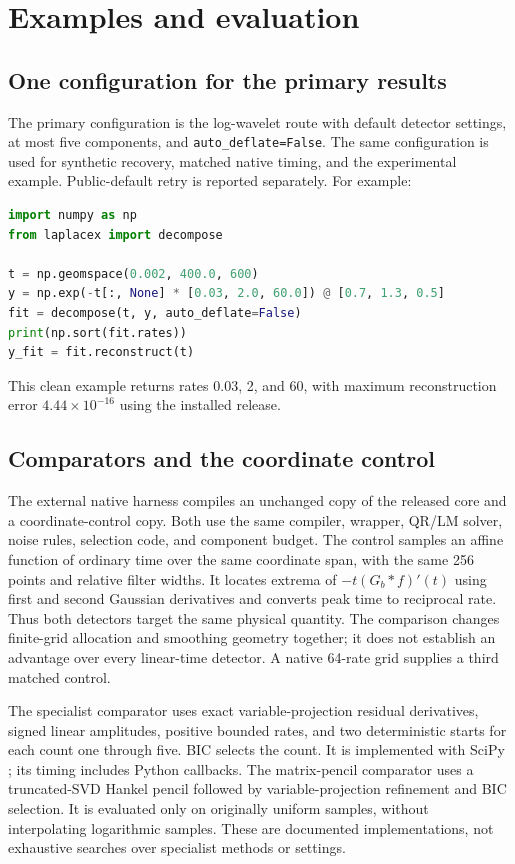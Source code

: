 \documentclass[preprint,11pt]{elsarticle}
\begin{document}
\section{Examples and evaluation}
\subsection{One configuration for the primary results}
The primary configuration is the log-wavelet route with default detector
settings, at most five components, and \texttt{auto\_deflate=False}.
The same configuration is used for synthetic recovery, matched native timing,
and the experimental example. Public-default retry is reported separately.
For example:
\begin{lstlisting}[language=Python]
import numpy as np
from laplacex import decompose

t = np.geomspace(0.002, 400.0, 600)
y = np.exp(-t[:, None] * [0.03, 2.0, 60.0]) @ [0.7, 1.3, 0.5]
fit = decompose(t, y, auto_deflate=False)
print(np.sort(fit.rates))
y_fit = fit.reconstruct(t)
\end{lstlisting}
This clean example returns rates 0.03, 2, and 60, with maximum reconstruction
error $4.44\times10^{-16}$ using the installed release.

\subsection{Comparators and the coordinate control}
The external native harness compiles an unchanged copy of the released core
and a coordinate-control copy. Both use the same compiler, wrapper, QR/LM
solver, noise rules, selection code, and component budget. The control samples
an affine function of ordinary time over the same coordinate span, with the
same 256 points and relative filter widths. It locates extrema of
$-t(G_b*f)'(t)$ using first and second Gaussian derivatives and converts peak
time to reciprocal rate. Thus both detectors target the same physical
quantity. The comparison changes finite-grid allocation and smoothing geometry
together; it does not establish an advantage over every linear-time detector.
A native 64-rate grid supplies a third matched control.

The specialist comparator uses exact variable-projection residual derivatives,
signed linear amplitudes, positive bounded rates, and two deterministic starts
for each count one through five. BIC selects the count. It is implemented with
SciPy \cite{scipy}; its timing includes Python callbacks. The matrix-pencil
comparator uses a truncated-SVD Hankel pencil followed by variable-projection
refinement and BIC selection. It is evaluated only on originally uniform
samples, without interpolating logarithmic samples. These are documented
implementations, not exhaustive searches over specialist methods or settings.
\end{document}
